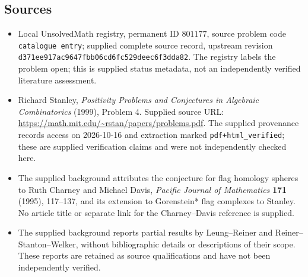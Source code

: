 \documentclass[11pt]{article}
\begin{document}
\subsection{Sources}
\begin{itemize}
\item Local UnsolvedMath registry, permanent ID \(801177\), source problem code \texttt{catalogue entry}; supplied complete source record, upstream revision \texttt{d371ee917ac9647fbb06cd6fc529deec6f3dda82}. The registry labels the problem open; this is supplied status metadata, not an independently verified literature assessment.
\item Richard Stanley, \emph{Positivity Problems and Conjectures in Algebraic Combinatorics} (1999), Problem 4. Supplied source URL: \url{https://math.mit.edu/~rstan/papers/problems.pdf}. The supplied provenance records access on 2026-10-16 and extraction marked \texttt{pdf+html\_verified}; these are supplied verification claims and were not independently checked here.
\item The supplied background attributes the conjecture for flag homology spheres to Ruth Charney and Michael Davis, \emph{Pacific Journal of Mathematics} \textbf{171} (1995), 117--137, and its extension to Gorenstein* flag complexes to Stanley. No article title or separate link for the Charney--Davis reference is supplied.
\item The supplied background reports partial results by Leung--Reiner and Reiner--Stanton--Welker, without bibliographic details or descriptions of their scope. These reports are retained as source qualifications and have not been independently verified.
\end{itemize}
\end{document}
